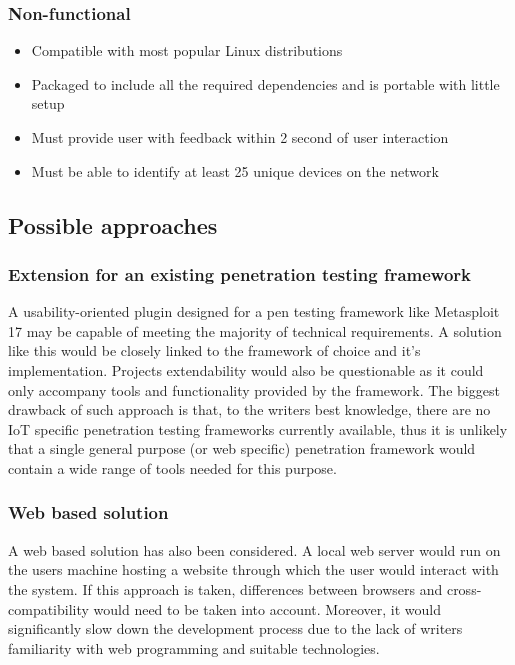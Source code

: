 	\subsubsection{Non-functional}
	\begin{itemize}
		\item Compatible with most popular Linux distributions
		\item Packaged to include all the required dependencies and is portable with little setup
		\item Must provide user with feedback within 2 second of user interaction
		\item Must be able to identify at least 25 unique devices on the network
	\end{itemize}


\subsection{Possible approaches}
	\subsubsection{Extension for an existing penetration testing framework}
	A usability-oriented plugin designed for a pen testing framework like Metasploit {17} may be capable of meeting the majority of technical requirements. A solution like this would be closely linked to the framework of choice and it's implementation. Projects extendability would also be questionable as it could only accompany tools and functionality provided by the framework. The biggest drawback of such approach is that, to the writers best knowledge, there are no IoT specific penetration testing frameworks currently available, thus it is unlikely that a single general purpose (or web specific) penetration framework would contain a wide range of tools needed for this purpose.
	
	\subsubsection{Web based solution}
	A web based solution has also been considered. A local web server would run on the users machine hosting a website through which the user would interact with the system. If this approach is taken, differences between browsers and cross-compatibility would need to be taken into account. Moreover, it would significantly slow down the development process due to the lack of writers familiarity with web programming and suitable technologies.
	
